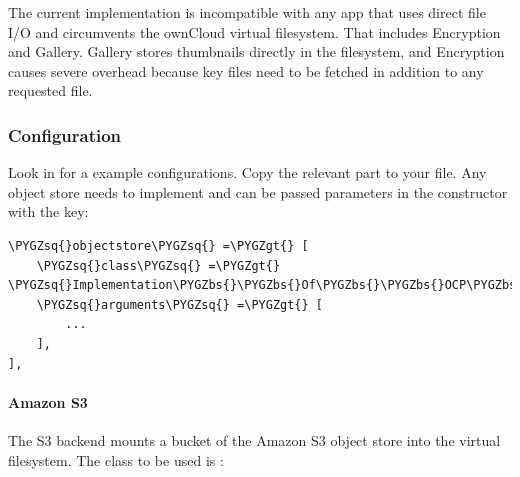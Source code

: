 \documentclass[letterpaper,10pt,english]{sphinxmanual}
\def\PYGZbs{\char`\\}
\def\PYGZgt{\char`\>}
\def\PYGZsq{\char`\'}
\begin{document}
The current implementation is incompatible with any app that uses
direct file I/O and circumvents the ownCloud virtual filesystem. That includes
Encryption and Gallery. Gallery stores thumbnails directly in the
filesystem, and Encryption causes severe overhead because key files need
to be fetched in addition to any requested file.


\subsubsection{Configuration}
\label{enterprise_external_storage/s3_swift_as_primary_object_store_configuration:configuration}
Look in  for a example configurations. Copy the
relevant part to your  file. Any object store needs to implement
 and can be passed parameters in the
constructor with the  key:

\begin{Verbatim}[commandchars=\\\{\}]
\PYGZsq{}objectstore\PYGZsq{} =\PYGZgt{} [
    \PYGZsq{}class\PYGZsq{} =\PYGZgt{} \PYGZsq{}Implementation\PYGZbs{}\PYGZbs{}Of\PYGZbs{}\PYGZbs{}OCP\PYGZbs{}\PYGZbs{}Files\PYGZbs{}\PYGZbs{}ObjectStore\PYGZbs{}\PYGZbs{}IObjectStore\PYGZsq{},
    \PYGZsq{}arguments\PYGZsq{} =\PYGZgt{} [
        ...
    ],
],
\end{Verbatim}


\paragraph{Amazon S3}
\label{enterprise_external_storage/s3_swift_as_primary_object_store_configuration:amazon-s3}
The S3 backend mounts a bucket of the Amazon S3 object store
into the virtual filesystem. The class to be used is :
\end{document}
